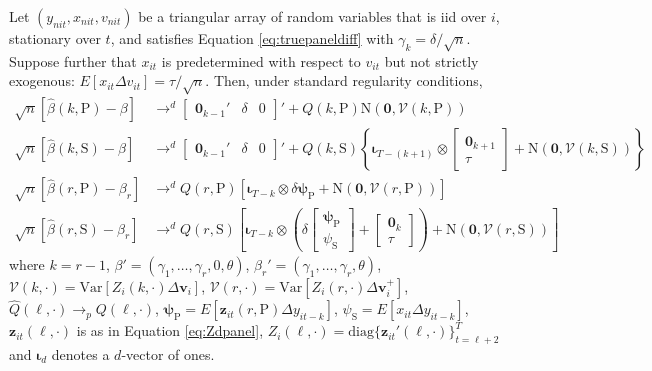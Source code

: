 \begin{thm}
  \label{thm:limitDpanel}
  Let $(y_{nit},x_{nit}, v_{nit})$ be a triangular array of random variables that is iid over $i$, stationary over $t$, and satisfies Equation \ref{eq:truepaneldiff} with $\gamma_k = \delta / \sqrt{n}$.
  Suppose further that $x_{it}$ is predetermined with respect to $v_{it}$ but not strictly exogenous: $E[x_{it}\Delta v_{it}] = \tau/\sqrt{n}$.
  Then, under standard regularity conditions,
  \begin{align*}
    \sqrt{n}\left[ \widehat{\beta}(k,\text{P})-\beta \right] &\rightarrow^d 
    \left[
    \begin{array}{ccc}
    \mathbf{0}_{k-1}'& \delta & 0
    \end{array}
  \right]' + 
    Q\left(k,\text{P} \right) \mbox{N}\left(\mathbf{0}, \mathcal{V}(k,\text{P})\right)  \\
    \sqrt{n}\left[ \widehat{\beta}(k,\text{S})-\beta \right] &\rightarrow^d 
    \left[
    \begin{array}{ccc}
    \mathbf{0}_{k-1}'& \delta & 0
    \end{array}
  \right]' + 
     Q\left(k,\text{S} \right) \left\{ \boldsymbol{\iota}_{T-(k +1)} \otimes \left[
    \begin{array}{c}
      \mathbf{0}_{k+1} \\ \tau
    \end{array}
  \right] + \mbox{N}\left(\mathbf{0}, \mathcal{V}(k,\text{S})\right)\right\}\\
    \sqrt{n}\left[ \widehat{\beta}(r,\text{P})- \beta_r \right] &\rightarrow^d Q(r,\text{P}) \left[\boldsymbol{\iota}_{T-k} \otimes \delta \boldsymbol{\psi}_{\text{P}} + \mbox{N}\left(\mathbf{0}, \mathcal{V}(r,\text{P}) \right) \right]\\
    \sqrt{n}\left[ \widehat{\beta}(r,\text{S})- \beta_r\right] &\rightarrow^d Q(r,\text{S}) \left[\boldsymbol{\iota}_{T-k} \otimes 
    \left( \delta \left[
  \begin{array}{c}
    \boldsymbol{\psi}_{\text{P}} \\ \psi_{\text{S}}
\end{array}
\right] + \left[
\begin{array}{c}
  \mathbf{0}_{k} \\ \tau
\end{array}
\right]\right) + \mbox{N}\left( \mathbf{0}, \mathcal{V}\left(r,\text{S}\right) \right)\right]
  \end{align*}
  where $k = r - 1$, $\beta' = (\gamma_1, \hdots, \gamma_{r}, 0, \theta)$, $\beta_r' = (\gamma_1, \hdots, \gamma_{r}, \theta)$, $\mathcal{V}(k,\cdot) = \mbox{Var}\left[ Z_i(k,\cdot) \Delta \mathbf{v}_i  \right]$, $\mathcal{V}(r,\cdot) = \mbox{Var}\left[ Z_i(r,\cdot) \Delta \mathbf{v}^{+}_i  \right]$, $\widehat{Q}(\ell,\cdot) \rightarrow_p Q(\ell,\cdot)$, $\boldsymbol{\psi}_{\text{P}} = E[\textbf{z}_{it}(r,\text{P}) \Delta y_{it -k}]$, $\psi_{\text{S}} = E[x_{it} \Delta y_{it-k}]$, $\mathbf{z}_{it}(\ell,\cdot)$ is as in Equation \ref{eq:Zdpanel}, $Z_i(\ell, \cdot)= \mbox{diag}\{\mathbf{z}_{it}'(\ell, \cdot)\}_{t=\ell+2}^T$ and $\boldsymbol{\iota}_{d}$ denotes a $d$-vector of ones.
\end{thm}

